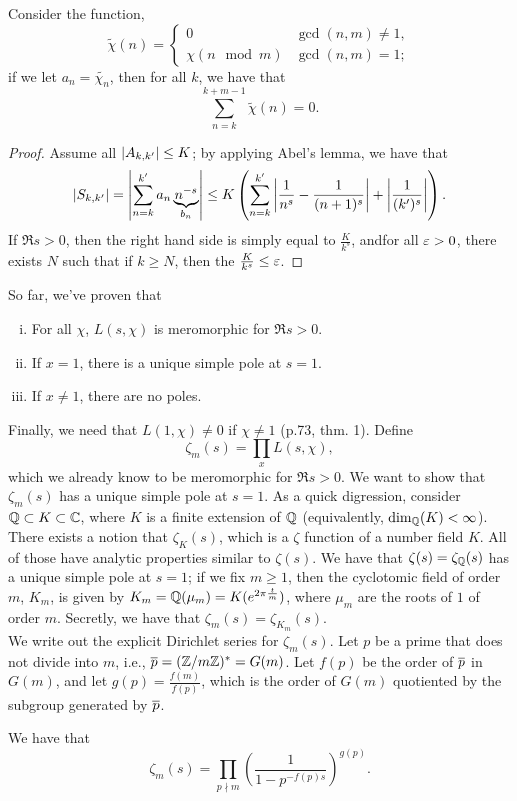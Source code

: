 \noindent Consider the function,
\[ \tilde{\chi}(n) = \begin{cases} 0 & \gcd(n, m) \neq 1, \\ \chi(n \mod m) & \gcd(n, m) = 1; \end{cases} \]
if we let $a_n = \tilde{\chi_n}$, then for all $k$, we have that
\[ \sum_{n=k}^{k+m-1} \tilde{\chi}(n) = 0. \]
\begin{proof}
    Assume all $\left\lvert A_{k,k'} \right\rvert \leq K$; by applying Abel's lemma, we have that
    \[ \left\lvert S_{k,k'} \right\rvert = \left\lvert \sum_{n=k}^{k'} a_n \underbrace{n^{-s}}_{b_n} \right\rvert \leq K \left(\sum_{n=k}^{k'} \left\lvert \frac{1}{n^s} - \frac{1}{(n + 1)^s} \right\rvert + \left\lvert \frac{1}{(k')^s} \right\rvert\right). \]
    If $\Re s > 0$, then the right hand side is simply equal to $\frac{K}{k^s}$, andfor all $\varepsilon > 0$, there exists $N$ such that if $k \geq N$, then the $\frac{K}{k^s} \leq \varepsilon$.
\end{proof}
\noindent So far, we've proven that
\begin{enumerate}[(i)]
    \item For all $\chi$, $L(s, \chi)$ is meromorphic for $\Re s > 0$.
    \item If $x = 1$, there is a unique simple pole at $s = 1$.
    \item If $x \neq 1$, there are no poles.
\end{enumerate}
Finally, we need that $L(1, \chi) \neq 0$ if $\chi \neq 1$ (p.73, thm. 1). Define
\[ \zeta_m(s) = \prod_x L(s, \chi), \]
which we already know to be meromorphic for $\Re s > 0$. We want to show that $\zeta_m(s)$ has a unique simple pole at $s = 1$. As a quick digression, consider $\mathbb Q \subset K \subset \mathbb C$, where $K$ is a finite extension of $\mathbb Q$ (equivalently, $\dim_\mathbb Q(K) < \infty$). There exists a notion that $\zeta_K(s)$, which is a $\zeta$ function of a number field $K$. All of those have analytic properties similar to $\zeta(s)$. We have that $\zeta(s) = \zeta_\mathbb Q(s)$ has a unique simple pole at $s = 1$; if we fix $m \geq 1$, then the cyclotomic field of order $m$, $K_m$, is given by $K_m = \mathbb Q(\mu_m) = K(e^{2\pi \frac{t}{m}})$, where $\mu_m$ are the roots of $1$ of order $m$. Secretly, we have that $\zeta_m(s) = \zeta_{K_m}(s)$.
\\[8pt]
We write out the explicit Dirichlet series for $\zeta_m(s)$. Let $p$ be a prime that does not divide into $m$, i.e., $\overline p = (\mathbb Z/m\mathbb Z)^\ast = G(m)$. Let $f(p)$ be the order of $\overline p$ in $G(m)$, and let $g(p) = \frac{f(m)}{f(p)}$, which is the order of $G(m)$ quotiented by the subgroup generated by $\overline p$.
\begin{claim}[Proposition 13]
    We have that
    \[ \zeta_m(s) = \prod_{p \nmid m} \left(\frac{1}{1 - p^{-f(p)s}}\right)^{g(p)}. \]
\end{claim}
